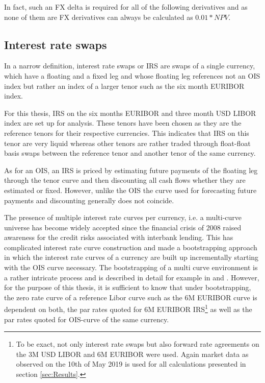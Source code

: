\documentclass[../Thesis_AHoecherl.tex]{subfiles}
\begin{document}
    In fact, such an FX delta is required for all of the following derivatives and as none of them are FX derivatives can always be calculated as $0.01 * NPV$.

    \subsection{Interest rate swaps}

    In a narrow definition, interest rate swaps or \gls{IRS} are swaps of a single currency, which have a floating and a fixed leg and whose floating leg references not an \gls{OIS} index but rather an index of a larger tenor such as the six month \gls{EURIBOR} index.

    For this thesis, \gls{IRS} on the six months \gls{EURIBOR} and three month USD \gls{LIBOR} index are set up for analysis.
    These tenors have been chosen as they are the reference tenors for their respective currencies. 
    This indicates that \gls{IRS} on this tenor are very liquid whereas other tenors are rather traded through float-float basis swaps between the reference tenor and another tenor of the same currency.

    As for an \gls{OIS}, an \gls{IRS} is priced by estimating future payments of the floating leg through the tenor curve and then discounting all cash flows whether they are estimated or fixed.
    However, unlike the \gls{OIS} the curve used for forecasting future payments and discounting generally does not coincide.

    The presence of multiple interest rate curves per currency, i.e. a multi-curve universe has become widely accepted since the financial crisis of 2008 raised awareness for the credit risks associated with interbank lending.
    This has complicated interest rate curve construction and made a bootstrapping approach in which the interest rate curves of a currency are built up incrementally starting with the \gls{OIS} curve necessary.
    The bootstrapping of a multi curve environment is a rather intricate process and is described in detail for example in \cite{ametrano2013everything} and \cite{brugger2018valuation}.
    However, for the purpose of this thesis, it is sufficient to know that under bootstrapping, the zero rate curve of a reference Libor curve such as the 6M \gls{EURIBOR} curve is dependent on both, the par rates quoted for 6M \gls{EURIBOR} \gls{IRS}\footnote{To be exact, not only interest rate swaps but also forward rate agreements on the 3M USD \gls{LIBOR} and 6M \gls{EURIBOR} were used. Again market data as observed on the 10th of May 2019 is used for all calculations presented in section \ref{sec:Results}.} as well as the par rates quoted for \gls{OIS}-curve of the same currency.
\end{document}
